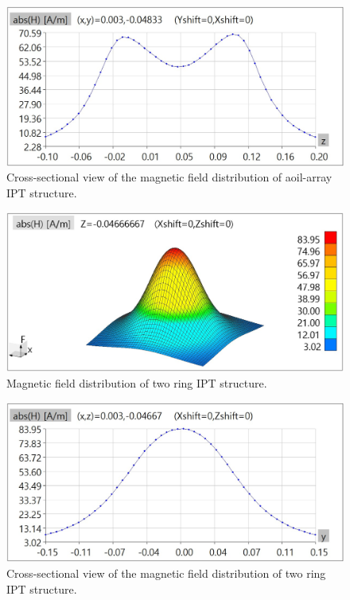 \begin{figure}[!t]
    \centering
    \includegraphics[width=0.9\linewidth]{images/4_coil_array_near_field_distribution_cut.JPG}
    \caption{Cross-sectional view of the magnetic field distribution of aoil-array IPT structure.}
\end{figure}

\begin{figure}[!t]
    \centering
    \includegraphics[width=0.9\linewidth]{images/4_two_ring_near_field_distribution.JPG}
    \caption{Magnetic field distribution of two ring IPT structure.}
\end{figure}

\begin{figure}[!t]
    \centering
    \includegraphics[width=0.9\linewidth]{images/4_two_ring_near_field_distribution_cut.JPG}
    \caption{Cross-sectional view of the magnetic field distribution of two ring IPT structure.}
\end{figure}

